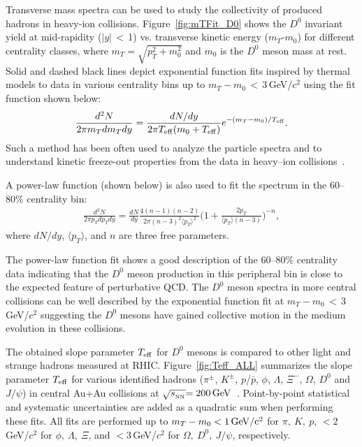 \documentclass[%
 reprint,	
 amsmath,amssymb,
 aps,
 prc,
]{revtex4-1}
\begin{document}
Transverse mass spectra can be used to study the collectivity of produced hadrons in heavy-ion collisions. Figure~\ref{fig:mTFit_D0} shows the $D^{0}$ invariant yield at mid-rapidity ($|y|$\,$<$\,1) vs. transverse kinetic energy ($m_{T}$-$m_{0}$) for different centrality classes, where $m_{T} = \sqrt{p_{T}^2+m_0^2}$ and $m_0$ is the $D^0$ meson mass at rest. Solid and dashed black lines depict exponential function fits inspired by thermal models to data in various centrality bins up to $m_{T}-m_{0}$\,$<$\,3\,GeV/$c^2$ using the fit function shown below:
\begin{equation}
  \begin{aligned}
\frac{d^2N}{2\pi m_{T}dm_{T}dy} = \frac{dN/dy}{2\pi T_{\rm eff}(m_0+T_{\rm eff})}e^{-(m_{T}-m_0)/T_{\rm eff}}.
  \end{aligned}
\label{equ:equation5}
\end{equation}
Such a method has been often used to analyze the particle spectra and to understand kinetic freeze-out properties from the data in heavy--ion collisions~\cite{Kaneta:1999lnf,StarWhitePaper}.


A power-law function (shown below) is also used to fit the spectrum in the 60--80\% centrality bin:
\begin{equation}
  \begin{aligned}
\frac{d^2N}{2\pi p_{T}dp_{T}dy} = \frac{dN}{dy}\frac{4(n-1)(n-2)}{2\pi (n-3)^2\langle p_{T} \rangle ^2}\bigg(1+\frac{2p_{T}}{\langle p_{T} \rangle (n-3)}\bigg)^{-n},
  \end{aligned}
\label{equ:equation6}
\end{equation}
where $dN/dy$, $\langle p_{T}\rangle$, and $n$ are three free parameters.

The power-law function fit shows a good description of the 60--80\% centrality data indicating that the $D^0$ meson production in this peripheral bin is close to the expected feature of perturbative QCD. The $D^0$ meson spectra in more central collisions can be well described by the exponential function fit at $m_{T}-m_{0}$\,$<$\,3\,GeV/$c^2$ suggesting the $D^0$ mesons have gained collective motion in the medium evolution in these collisions.


The obtained slope parameter $T_{\rm eff}$ for $D^0$ mesons is compared to other light and strange hadrons measured at RHIC. 
Figure~\ref{fig:Teff_ALL} summarizes the slope parameter $T_{\rm eff}$ for various identified hadrons ($\pi^{\pm}$, $K^{\pm}$, $p$/$\bar{p}$, $\phi$, $\Lambda$, $\Xi^-$, $\Omega$, $D^0$ and $J/\psi$) in central Au+Au collisions at $\sqrt{s_{_{\rm NN}}} {\rm = 200\,GeV}$~\cite{Adams:2003xp,Abelev:2007rw,Adams:2006ke,Adamczyk:2013tvk}. Point-by-point statistical and systematic uncertainties are added as a quadratic sum when performing these fits. All fits are performed up to $m_{T} - m_{0} <1\,\rm{GeV}/c^2$ for $\pi,\ K,\ p$, $<2$\,GeV/$c^2$ for $\phi,\ \Lambda,\ \Xi$, and $<3$\,GeV/$c^2$ for $\Omega,\ D^{0},\ J/\psi$, respectively. 
\end{document}
